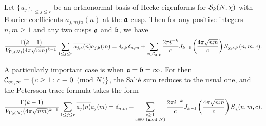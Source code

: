     \begin{theorem}
      Let $\{u_{j}\}_{1 \le j \le r}$ be an orthonormal basis of Hecke eigenforms for $\mathcal{S}_{k}(N,\chi)$ with Fourier coefficients $a_{j,
      mf{a}}(n)$ at the $\mathfrak{a}$ cusp. Then for any positive integers $n,m \ge 1$ and any two cusps $\mathfrak{a}$ and $\mathfrak{b}$, we have
      \[
        \frac{\Gamma(k-1)}{V_{\Gamma_{0}(N)}(4\pi \sqrt{nm})^{k-1}}\sum_{1 \le j \le r}\overline{a_{j,\mathfrak{a}}(n)}a_{j,\mathfrak{b}}(m) = \delta_{\mathfrak{a},\mathfrak{b}}\delta_{n,m}+\sum_{c \in \mathcal{C}_{\mathfrak{a},\mathfrak{b}}}\frac{2\pi i^{-k}}{c}J_{k-1}\left(\frac{4\pi\sqrt{nm}}{c}\right)S_{\chi,\mathfrak{a},\mathfrak{b}}(n,m,c).
      \]
    \end{theorem}

    A particularly important case is when $\mathfrak{a} = \mathfrak{b} = \infty$. For then $\mathcal{C}_{\infty,\infty} = \{c \ge 1:c \equiv 0 \ \left(\text{mod }N\right)\}$, the Sali\'e sum reduces to the usual one, and the Petersson trace formula takes the form
    \[
      \frac{\Gamma(k-1)}{V_{\Gamma_{0}(N)}(4\pi \sqrt{nm})^{k-1}}\sum_{1 \le j \le r}\overline{a_{j}(n)}a_{j}(m) = \delta_{n,m}+\sum_{\substack{c \ge 1 \\ c \equiv 0 \ \left(\text{mod }N\right)}}\frac{2\pi i^{-k}}{c}J_{k-1}\left(\frac{4\pi\sqrt{nm}}{c}\right)S_{\chi}(n,m,c).
    \]
